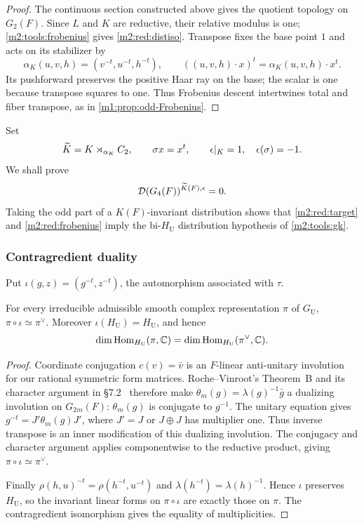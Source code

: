 \begin{proof}
The continuous section constructed above gives the quotient topology on $G_2(F)$.
Since $L$ and $K$ are reductive, their relative modulus is one;
\cref{m2:tools:frobenius} gives \eqref{m2:red:distiso}.
Transpose fixes the base point $1$ and acts on its stabilizer by
\begin{equation}\label{m2:red:alpha}
 \alpha_K(u,v,h)=(v^{-t},u^{-t},h^{-t}),
 \qquad ((u,v,h)\cdot x)^t=\alpha_K(u,v,h)\cdot x^t.
\end{equation}
Its pushforward preserves the positive Haar ray on the base; the
scalar is one because transpose squares to one. Thus Frobenius descent
intertwines total and fiber transpose, as in
\cref{m1:prop:odd-Frobenius}.
\end{proof}

Set
\begin{equation}\label{m2:red:extension}
 \widetilde K=K\rtimes_{\alpha_K}C_2,
 \qquad \sigma x=x^t,\qquad
 \epsilon|_K=1,\quad\epsilon(\sigma)=-1.
\end{equation}
We shall prove
\begin{equation}\label{m2:red:target}
 \mathcal D(G_4(F))^{\widetilde K(F),\epsilon}=0.
\end{equation}
Taking the odd part of a $K(F)$-invariant distribution shows that
\eqref{m2:red:target} and \cref{m2:red:frobenius} imply the
bi-$H_{\mathrm U}$ distribution hypothesis of \cref{m2:tools:gk}.

\subsubsection{Contragredient duality}

Put $\iota(g,z)=(g^{-t},z^{-t})$, the automorphism associated with $\tau$.

\begin{proposition}\label{m2:red:duality}
For every irreducible admissible smooth complex representation
$\pi$ of $G_{\mathrm U}$, $\pi\circ\iota\simeq\pi^\vee$. Moreover
$\iota(H_{\mathrm U})=H_{\mathrm U}$, and hence
\[
 \dim\operatorname{Hom}_{H_{\mathrm U}}(\pi,\mathbb C)
 =\dim\operatorname{Hom}_{H_{\mathrm U}}(\pi^\vee,\mathbb C).
\]
\end{proposition}

\begin{proof}
Coordinate conjugation $c(v)=\bar v$ is an $F$-linear anti-unitary
involution for our rational symmetric form matrices. Roche--Vinroot's
Theorem~B and its character argument in \S7.2~\cite{RocheVinroot18}
therefore make $\theta_m(g)=\lambda(g)^{-1}\bar g$ a dualizing
involution on $G_{2m}(F)$: $\theta_m(g)$ is conjugate to $g^{-1}$.
The unitary equation gives $g^{-t}=J'\theta_m(g)J'$, where
$J'=J$ or $J\oplus J$ has multiplier one. Thus inverse transpose
is an inner modification of this dualizing involution. The conjugacy
and character argument applies componentwise to the reductive product,
giving $\pi\circ\iota\simeq\pi^\vee$.

Finally $\rho(h,u)^{-t}=\rho(h^{-t},u^{-t})$ and
$\lambda(h^{-t})=\lambda(h)^{-1}$. Hence $\iota$ preserves
$H_{\mathrm U}$, so the invariant linear forms on $\pi\circ\iota$
are exactly those on $\pi$. The contragredient isomorphism gives the
equality of multiplicities.
\end{proof}

